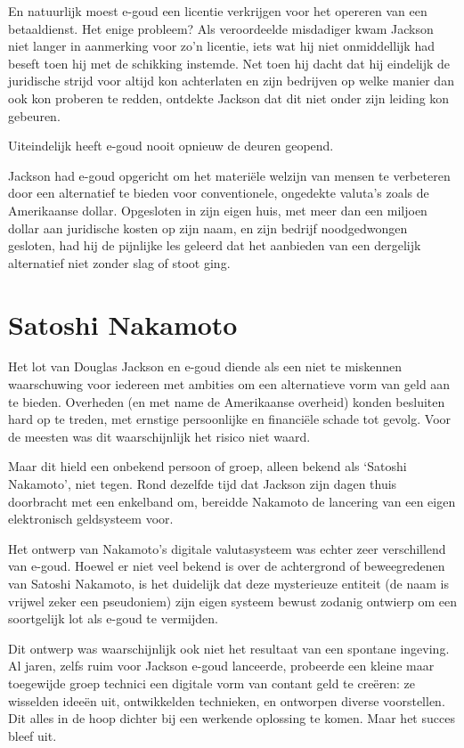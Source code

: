 \documentclass[
  a5paper,
  smalldemyvopaper,11pt,twoside,onecolumn,openright,extrafontsizes,
hidelinks]{memoir}
\begin{document}
En natuurlijk moest e-goud een licentie verkrijgen voor het opereren van
een betaaldienst. Het enige probleem? Als veroordeelde misdadiger kwam
Jackson niet langer in aanmerking voor zo'n licentie, iets wat hij niet
onmiddellijk had beseft toen hij met de schikking instemde. Net toen hij
dacht dat hij eindelijk de juridische strijd voor altijd kon achterlaten
en zijn bedrijven op welke manier dan ook kon proberen te redden,
ontdekte Jackson dat dit niet onder zijn leiding kon gebeuren.

Uiteindelijk heeft e-goud nooit opnieuw de deuren geopend.

Jackson had e-goud opgericht om het materiële welzijn van mensen te
verbeteren door een alternatief te bieden voor conventionele, ongedekte
valuta's zoals de Amerikaanse dollar. Opgesloten in zijn eigen huis, met
meer dan een miljoen dollar aan juridische kosten op zijn naam, en zijn
bedrijf noodgedwongen gesloten, had hij de pijnlijke les geleerd dat het
aanbieden van een dergelijk alternatief niet zonder slag of stoot ging.

\section*{Satoshi Nakamoto}\label{satoshi-nakamoto}


Het lot van Douglas Jackson en e-goud diende als een niet te miskennen
waarschuwing voor iedereen met ambities om een alternatieve vorm van
geld aan te bieden. Overheden (en met name de Amerikaanse overheid)
konden besluiten hard op te treden, met ernstige persoonlijke en
financiële schade tot gevolg. Voor de meesten was dit waarschijnlijk het
risico niet waard.

Maar dit hield een onbekend persoon of groep, alleen bekend als `Satoshi
Nakamoto', niet tegen. Rond dezelfde tijd dat Jackson zijn dagen thuis
doorbracht met een enkelband om, bereidde Nakamoto de lancering van een
eigen elektronisch geldsysteem voor.

Het ontwerp van Nakamoto's digitale valutasysteem was echter zeer
verschillend van e-goud. Hoewel er niet veel bekend is over de
achtergrond of beweegredenen van Satoshi Nakamoto, is het duidelijk dat
deze mysterieuze entiteit (de naam is vrijwel zeker een pseudoniem) zijn
eigen systeem bewust zodanig ontwierp om een soortgelijk lot als e-goud
te vermijden.

Dit ontwerp was waarschijnlijk ook niet het resultaat van een spontane
ingeving. Al jaren, zelfs ruim voor Jackson e-goud lanceerde, probeerde
een kleine maar toegewijde groep technici een digitale vorm van contant
geld te creëren: ze wisselden ideeën uit, ontwikkelden technieken, en
ontworpen diverse voorstellen. Dit alles in de hoop dichter bij een
werkende oplossing te komen. Maar het succes bleef uit.
\end{document}
